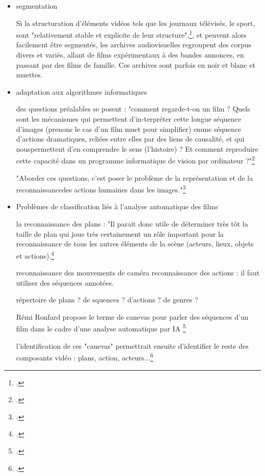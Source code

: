 \begin{itemize}
\item segmentation

Si la structuration d'éléments vidéos tels que les journaux télévisés, le sport, sont "relativement stable et explicite de leur structure",\footcite{carrive2014}, et peuvent alors facilement être segmentés, les archives audiovisuelles regroupent des corpus divers et variés, allant de films expérimentaux à des bandes annonces, en passant par des films de famille. Ces archives sont parfois en noir et blanc et muettes. 

\item adaptation aux algorithmes informatiques

des questions préalables se posent : 
"comment regarde-t-on un ﬁlm ? Quels sont les mécanismes qui permettent d’in-terpréter cette longue séquence d’images (prenons le cas d’un ﬁlm muet pour simpliﬁer) enune séquence d’actions dramatiques, reliées entre elles par des liens de causalité, et qui nouspermettent d’en comprendre le sens (l’histoire) ? Et comment reproduire cette capacité dans un programme informatique de vision par ordinateur ?"\footcite{zotero-item-644}

"Aborder ces questions, c’est poser le problème de la représentation et de la reconnaissancedes actions humaines dans les images."\footcite{zotero-item-644}

\item Problèmes de classification liés à l'analyse automatique des films

la reconnaissance des plans : "Il parait donc
utile de déterminer très tôt la taille de plan qui joue très certainement un rôle important pour la
reconnaissance de tous les autres éléments de la scène (acteurs, lieux, objets et actions).\footcite{zotero-item-644}

reconnaissance des mouvements de caméra
reconnaissance des actions : il faut utiliser des séquences annotées.

répertoire de plans ? de squences ? d'actions ? de genres ?

Rémi Ronfard propose le terme de canevas pour parler des séquences d'un film dans le cadre d'une analyse automatique par IA \footcite{zotero-item-644}

l'identification de ces "canevas" permettrait ensuite d'identifier le reste des composants vidéo : plans, action, acteurs...\footcite{zotero-item-644}

\end{itemize}